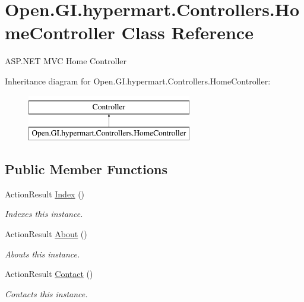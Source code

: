 \hypertarget{class_open_1_1_g_i_1_1hypermart_1_1_controllers_1_1_home_controller}{}\section{Open.\+G\+I.\+hypermart.\+Controllers.\+Home\+Controller Class Reference}
\label{class_open_1_1_g_i_1_1hypermart_1_1_controllers_1_1_home_controller}


A\+S\+P.\+N\+ET M\+VC Home Controller  


Inheritance diagram for Open.\+G\+I.\+hypermart.\+Controllers.\+Home\+Controller\+:\begin{figure}[H]
\begin{center}
\leavevmode
\includegraphics[height=2.000000cm]{class_open_1_1_g_i_1_1hypermart_1_1_controllers_1_1_home_controller}
\end{center}
\end{figure}
\subsection*{Public Member Functions}
\begin{DoxyCompactItemize}
\item 
Action\+Result \hyperlink{class_open_1_1_g_i_1_1hypermart_1_1_controllers_1_1_home_controller_a18ad180258caf702a7cfe51c16bf5558}{Index} ()
\begin{DoxyCompactList}\small\item\em Indexes this instance. \end{DoxyCompactList}\item 
Action\+Result \hyperlink{class_open_1_1_g_i_1_1hypermart_1_1_controllers_1_1_home_controller_a6d90d2a8ae2ce9f7c9ec38b175847e6f}{About} ()
\begin{DoxyCompactList}\small\item\em Abouts this instance. \end{DoxyCompactList}\item 
Action\+Result \hyperlink{class_open_1_1_g_i_1_1hypermart_1_1_controllers_1_1_home_controller_a758666761af826c9091b8a8655eb5e18}{Contact} ()
\begin{DoxyCompactList}\small\item\em Contacts this instance. \end{DoxyCompactList}\end{DoxyCompactItemize}


